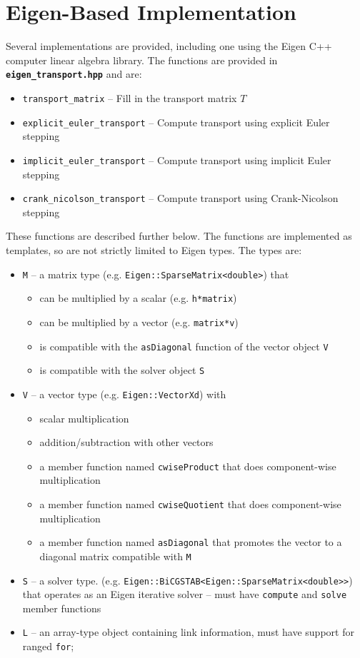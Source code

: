 \documentclass[10pt]{report}
\newcommand{\filename}[1]{\textbf{\texttt{#1}}}
\begin{document}
\section{Eigen-Based Implementation}
Several implementations are provided, including one using the Eigen C++ computer linear
algebra library. The functions are provided in \filename{eigen\_transport.hpp} and are:
\begin{itemize}
\item \texttt{transport\_matrix} -- Fill in the transport matrix $T$
\item \texttt{explicit\_euler\_transport} -- Compute transport using explicit Euler stepping
\item \texttt{implicit\_euler\_transport} -- Compute transport using implicit Euler stepping
\item \texttt{crank\_nicolson\_transport} -- Compute transport using Crank-Nicolson stepping
\end{itemize}
These functions are described further below. The functions are implemented as templates, so are not strictly
limited to Eigen types. The types are:
\begin{itemize}
\item \texttt{M} -- a matrix type (e.g. \texttt{Eigen::SparseMatrix\textless{}double\textgreater}) that
\begin{itemize}
\item can be multiplied by a scalar (e.g. \texttt{h*matrix})
\item can be multiplied by a vector  (e.g. \texttt{matrix*v})
\item is compatible with the \texttt{asDiagonal} function of the vector object \texttt{V}
\item is compatible with the solver object \texttt{S}
\end{itemize}
\item \texttt{V} -- a vector type (e.g. \texttt{Eigen::VectorXd}) with
\begin{itemize}
\item scalar multiplication
\item addition/subtraction with other vectors
\item a member function named \texttt{cwiseProduct} that does component-wise multiplication
\item a member function named \texttt{cwiseQuotient} that does component-wise multiplication
\item a member function named \texttt{asDiagonal} that promotes the vector to a diagonal matrix compatible with \texttt{M}
\end{itemize}
\item \texttt{S} -- a solver type. (e.g. \texttt{Eigen::BiCGSTAB\textless{}Eigen::SparseMatrix\textless{}double\textgreater\textgreater}) that operates as an Eigen iterative solver -- must have \texttt{compute} and \texttt{solve} member functions
\item \texttt{L} -- an array-type object containing link information, must have support for ranged \texttt{for};
\end{itemize}
\end{document}
